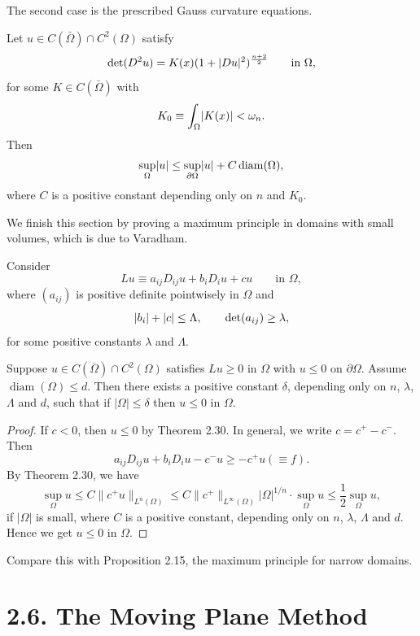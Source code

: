 The second case is the prescribed Gauss curvature equations.

\begin{corollary}\label{hanlin:maxprin-cor-2-41}
Let $u \in C(\bar{\Omega}) \cap C^2(\Omega)$ satisfy
\[
\det(D^2u)=K(x)(1+\lvert Du\rvert^2)^{\frac{n+2}{2}}\qquad \text{in }\Omega,
\]
for some $K \in C(\bar{\Omega})$ with
\[
K_0 \equiv \int_{\Omega} \lvert K(x)\rvert < \omega_n.
\]
Then
\[
\sup_{\Omega}\lvert u\rvert \le \sup_{\partial\Omega}\lvert u\rvert + C\operatorname{diam}(\Omega),
\]
where $C$ is a positive constant depending only on $n$ and $K_0$.
\end{corollary}

We finish this section by proving a maximum principle in domains with small volumes, which is due to Varadham.

Consider
\[
Lu \equiv a_{ij}D_{ij}u+b_iD_iu+cu \qquad \text{in }\Omega,
\]
where $(a_{ij})$ is positive definite pointwisely in $\Omega$ and
\[
\lvert b_i\rvert+\lvert c\rvert \le \Lambda,\qquad \det(a_{ij})\ge \lambda,
\]
for some positive constants $\lambda$ and $\Lambda$.

\begin{theorem}\label{hanlin:maxprin-theorem-2-42}
Suppose $u \in C(\overline{\Omega}) \cap C^2(\Omega)$ satisfies $Lu \ge 0$ in $\Omega$ with $u \le 0$ on $\partial \Omega$. Assume $\operatorname{diam}(\Omega) \le d$. Then there exists a positive constant $\delta$, depending only on $n$, $\lambda$, $\Lambda$ and $d$, such that if $|\Omega| \le \delta$ then $u \le 0$ in $\Omega$.
\end{theorem}

\begin{proof}
\sketch
If $c < 0$, then $u \le 0$ by Theorem 2.30. In general, we write $c = c^+ - c^-$. Then
\[
a_{ij} D_{ij}u + b_i D_i u - c^-u \ge -c^+u (\equiv f).
\]
By Theorem 2.30, we have
\[
\sup_{\Omega} u \le C \|c^+u\|_{L^n(\Omega)} \le C \|c^+\|_{L^\infty(\Omega)} |\Omega|^{1/n} \cdot \sup_{\Omega} u \le \frac{1}{2}\sup_{\Omega} u,
\]
if $|\Omega|$ is small, where $C$ is a positive constant, depending only on $n$, $\lambda$, $\Lambda$ and $d$.
Hence we get $u \le 0$ in $\Omega$.
\end{proof}

Compare this with Proposition 2.15, the maximum principle for narrow domains.

\section*{2.6. The Moving Plane Method}

